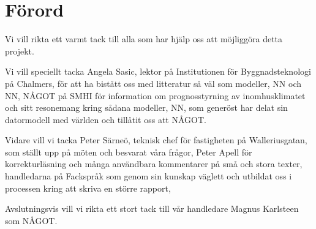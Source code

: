 \chapter*{Förord}


Vi vill rikta ett varmt tack till alla som har hjälp oss att möjliggöra detta projekt. 

Vi vill speciellt tacka Angela Sasic, lektor på Institutionen för Byggnadsteknologi på Chalmers, för att ha bistått oss med litteratur så väl som modeller, NN och NN, NÅGOT på SMHI för information om prognosstyrning av inomhusklimatet och sitt resonemang kring sådana modeller, NN, som generöst har delat sin datormodell med världen och tillåtit oss att NÅGOT.

Vidare vill vi tacka Peter Särneö, teknisk chef för fastigheten på Walleriusgatan, som ställt upp på möten och besvarat våra frågor, Peter Apell för korrekturläsning och många användbara kommentarer på små och stora texter, handledarna på Fackspråk som genom sin kunskap väglett och utbildat oss i processen kring att skriva en större rapport,

Avslutningsvis vill vi rikta ett stort tack till vår handledare Magnus Karlsteen som NÅGOT.

